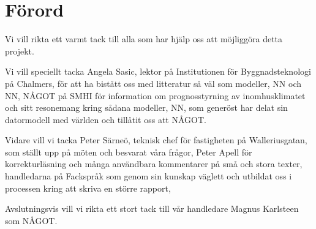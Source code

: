 \chapter*{Förord}


Vi vill rikta ett varmt tack till alla som har hjälp oss att möjliggöra detta projekt. 

Vi vill speciellt tacka Angela Sasic, lektor på Institutionen för Byggnadsteknologi på Chalmers, för att ha bistått oss med litteratur så väl som modeller, NN och NN, NÅGOT på SMHI för information om prognosstyrning av inomhusklimatet och sitt resonemang kring sådana modeller, NN, som generöst har delat sin datormodell med världen och tillåtit oss att NÅGOT.

Vidare vill vi tacka Peter Särneö, teknisk chef för fastigheten på Walleriusgatan, som ställt upp på möten och besvarat våra frågor, Peter Apell för korrekturläsning och många användbara kommentarer på små och stora texter, handledarna på Fackspråk som genom sin kunskap väglett och utbildat oss i processen kring att skriva en större rapport,

Avslutningsvis vill vi rikta ett stort tack till vår handledare Magnus Karlsteen som NÅGOT.

